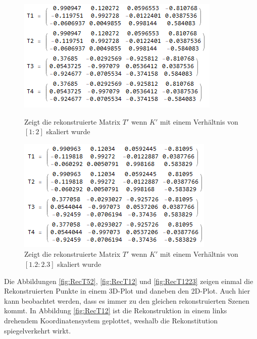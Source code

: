 \begin{figure}[!htb]
	\includegraphics[width=\linewidth]{images/R_12.png}
	\caption[Vier Lösungen für $T$ bei $K'$ mit 1:2]{Zeigt die rekonstruierte Matrix $T'$ wenn $K'$ mit einem Verhältnis von $[1:2]$ skaliert wurde}
	\label{fig:T12}
	\endminipage\hfill
	\includegraphics[width=\linewidth]{images/R_12_23.png}
	\caption[Vier Lösungen für $T$ bei $K'$ mit 1.2 : 2.3]{Zeigt die rekonstruierte Matrix $T'$ wenn $K'$ mit einem Verhältnis von $[1.2:2.3]$ skaliert wurde}
	\label{fig:T1223}
	\endminipage\hfill
\end{figure}
\pagebreak

Die Abbildungen \ref{fig:RecT52}, \ref{fig:RecT12} und \ref{fig:RecT1223} zeigen einmal die Rekonstruierten Punkte in einem 3D-Plot und daneben den 2D-Plot. Auch hier kann beobachtet werden, dass es immer zu den gleichen rekonstruierten Szenen kommt. In Abbildung \ref{fig:RecT12} ist die Rekonstruktion in einem links drehendem Koordinatensystem geplottet, weshalb die Rekonstitution spiegelverkehrt wirkt. 

